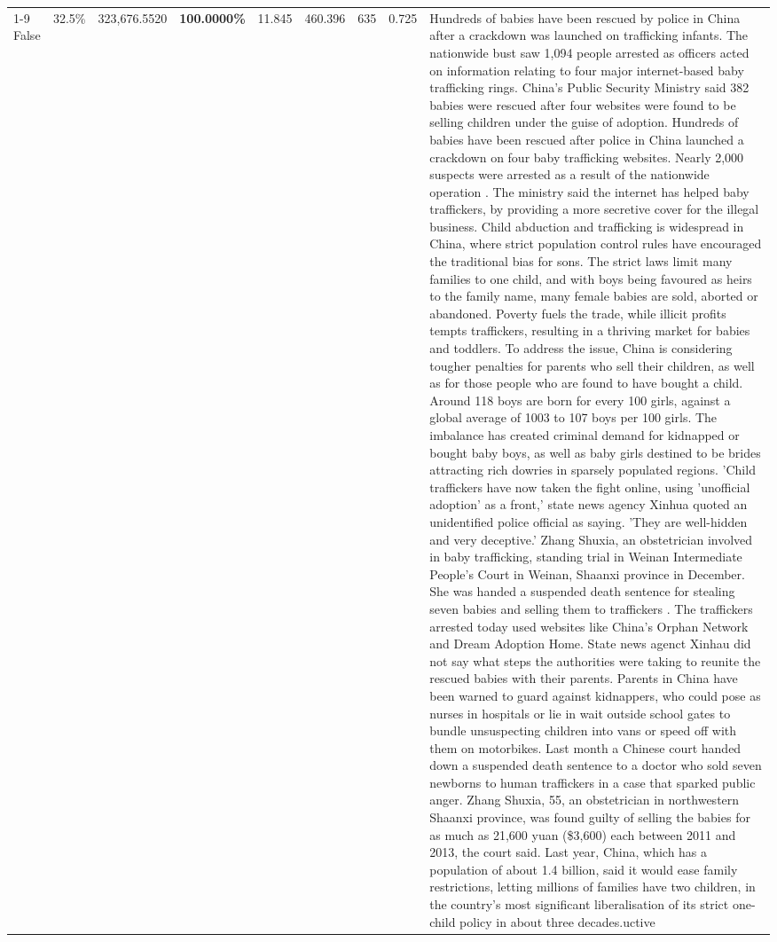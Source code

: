 \begin{table}[H]
\begin{tabular}{lllrlllll}
\cline{1-9}
False & 32.5\% & 323,676.5520 & \bfseries \color{red} 100.0000\% & 11.845 & 460.396 & 635 & 0.725 & Hundreds of babies have been rescued by police in China after a crackdown was launched on trafficking infants. The nationwide bust saw 1,094 people arrested as officers acted on information relating to four major internet-based baby trafficking rings. China's Public Security Ministry said 382 babies were rescued after four websites were found to be selling children under the guise of adoption. Hundreds of babies have been rescued after police in China launched a crackdown on four baby trafficking websites. Nearly 2,000 suspects were arrested as a result of the nationwide operation . The ministry said the internet has helped baby traffickers, by providing a more secretive cover for the illegal business. Child abduction and trafficking is widespread in China, where strict population control rules have encouraged the traditional bias for sons. The strict laws limit many families to one child, and with boys being favoured as heirs to the family name, many female babies are sold, aborted or abandoned. Poverty fuels the trade, while illicit profits tempts traffickers, resulting in a thriving market for babies and toddlers. To address the issue, China is considering tougher penalties for parents who sell their children, as well as for those people who are found to have bought a child. Around 118 boys are born for every 100 girls, against a global average of 1003 to 107 boys per 100 girls. The imbalance has created criminal demand for kidnapped or bought baby boys, as well as baby girls destined to be brides attracting rich dowries in sparsely populated regions. 'Child traffickers have now taken the fight online, using 'unofficial adoption' as a front,' state news agency Xinhua quoted an unidentified police official as saying. 'They are well-hidden and very deceptive.' Zhang Shuxia, an obstetrician involved in baby trafficking, standing trial in Weinan Intermediate People's Court in Weinan, Shaanxi province in December. She was handed a suspended death sentence for stealing seven babies and selling them to traffickers . The traffickers arrested today used websites like China's Orphan Network and Dream Adoption Home. State news agenct Xinhau did not say what steps the authorities were taking to reunite the rescued babies with their parents. Parents in China have been warned to guard against kidnappers, who could pose as nurses in hospitals or lie in wait outside school gates to bundle unsuspecting children into vans or speed off with them on motorbikes. Last month a Chinese court handed down a suspended death sentence to a doctor who sold seven newborns to human traffickers in a case that sparked public anger. Zhang Shuxia, 55, an obstetrician in northwestern Shaanxi province, was found guilty of selling the babies for as much as 21,600 yuan (\$3,600) each between 2011 and 2013, the court said. Last year, China, which has a population of about 1.4 billion, said it would ease family restrictions, letting millions of families have two children, in the country's most significant liberalisation of its strict one-child policy in about three decades.uctive \\

\end{tabular}
\end{table}
